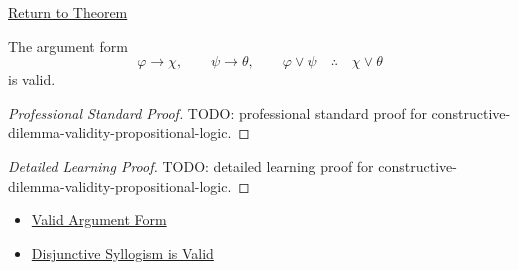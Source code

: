 \newpage
{}
\label{prf:constructive-dilemma-validity-propositional-logic}

\begin{remark*}[Return]
\hyperref[thm:constructive-dilemma-validity-propositional-logic]{Return to Theorem}
\end{remark*}

\begin{theorem*}
The argument form
\[
\varphi\to\chi,\qquad \psi\to\theta,\qquad \varphi\lor\psi
\quad\therefore\quad
\chi\lor\theta
\]
is valid.
\end{theorem*}

\begin{proof}[Professional Standard Proof]
\LRAProofBodyStart
TODO: professional standard proof for constructive-dilemma-validity-propositional-logic.
\end{proof}

\begin{proof}[Detailed Learning Proof]
\LRAProofBodyStart
TODO: detailed learning proof for constructive-dilemma-validity-propositional-logic.
\end{proof}

\begin{remark*}
\end{remark*}

\begin{dependencies}
\begin{itemize}
  \item \hyperref[def:valid-argument-form-propositional-logic]{Valid Argument Form}
  \item \hyperref[thm:disjunctive-syllogism-validity-propositional-logic]{Disjunctive Syllogism is Valid}
\end{itemize}
\end{dependencies}

\clearpage
